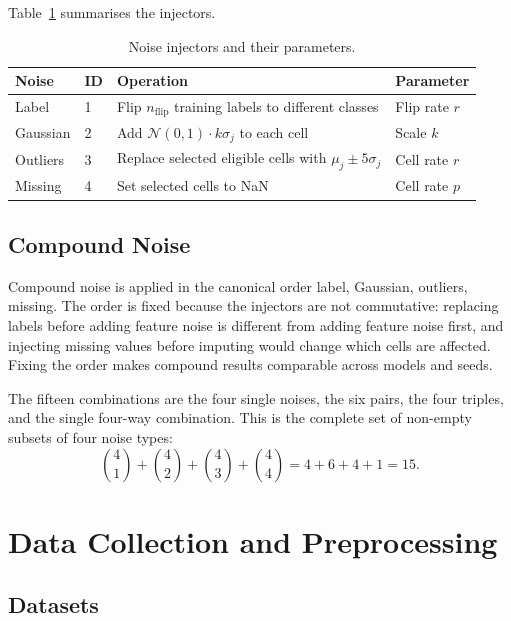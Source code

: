 Table~\ref{tab:noise} summarises the injectors.

\begin{table}[H]
\centering
\caption{Noise injectors and their parameters.}
\label{tab:noise}
\small
\begin{tabular}{p{2.4cm}p{2.0cm}p{5.0cm}p{3.4cm}}
\toprule
\textbf{Noise} & \textbf{ID} & \textbf{Operation} & \textbf{Parameter} \\
\midrule
Label & 1 & Flip $n_{\text{flip}}$ training labels to different classes & Flip rate $r$ \\
Gaussian & 2 & Add $\mathcal{N}(0,1)\cdot k\sigma_j$ to each cell & Scale $k$ \\
Outliers & 3 & Replace selected eligible cells with $\mu_j \pm 5\sigma_j$ & Cell rate $r$ \\
Missing & 4 & Set selected cells to NaN & Cell rate $p$ \\
\bottomrule
\end{tabular}
\end{table}

\subsection{Compound Noise}

Compound noise is applied in the canonical order label, Gaussian, outliers, missing. The order is fixed because the injectors are not commutative: replacing labels before adding feature noise is different from adding feature noise first, and injecting missing values before imputing would change which cells are affected. Fixing the order makes compound results comparable across models and seeds.

The fifteen combinations are the four single noises, the six pairs, the four triples, and the single four-way combination. This is the complete set of non-empty subsets of four noise types:
\begin{equation}
\binom{4}{1}+\binom{4}{2}+\binom{4}{3}+\binom{4}{4} = 4+6+4+1 = 15.
\end{equation}

\section{Data Collection and Preprocessing}

\subsection{Datasets}

